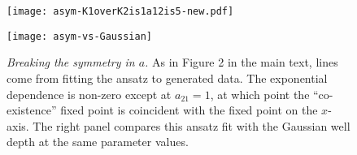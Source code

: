 \begin{figure}[ht]
	\centering
	\begin{minipage}{0.49\linewidth}
		\centering
		\texttt{[image: asym-K1overK2is1a12is5-new.pdf]}
	\end{minipage}
	\begin{minipage}{0.49\linewidth}
		\centering
		\texttt{[image: asym-vs-Gaussian]}
	\end{minipage}
	\centering
	\caption{\emph{Breaking the symmetry in $a$.} As in Figure 2 in the main text, lines come from fitting the ansatz to generated data. The exponential dependence is non-zero except at $a_{21}=1$, at which point the ``co-existence'' fixed point is coincident with the fixed point on the $x$-axis. The right panel compares this ansatz fit with the Gaussian well depth at the same parameter values. } %
	\label{asymmetrica}
\end{figure}%

